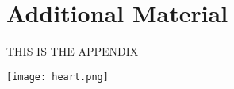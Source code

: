 
\chapter{\label{app:1} Additional Material}

\minitoc

THIS IS THE APPENDIX

\par

{ 
  \texttt{[image: heart.png]}
  \label{fig:heart}
}


